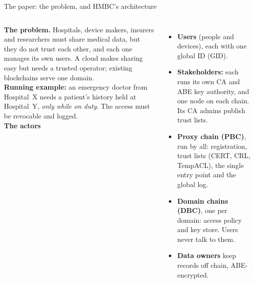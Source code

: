 \documentclass[aspectratio=169,10pt]{beamer}
\begin{document}
\begin{frame}{The paper: the problem, and HMBC's architecture}
\begin{columns}[T,onlytextwidth]
\scriptsize
\textbf{The problem.} Hospitals, device makers, insurers and researchers must share medical data, but \alert{they do not trust each other}, and each one manages its own users. A cloud makes sharing easy but needs a trusted operator; existing blockchains serve one domain.\\[0.3em]
\textbf{Running example:} an emergency doctor from Hospital~X needs a patient's history held at Hospital~Y, \emph{only while on duty}. The access must be revocable and logged.\\[0.3em]
\textbf{The actors}
\begin{itemize}\setlength{\itemsep}{1pt}
  \item \textbf{Users} (people and devices), each with one global ID (GID).
  \item \textbf{Stakeholders:} each runs its own CA and ABE key authority, and one node on each chain. Its CA admins publish trust lists.
  \item \textbf{\textcolor{pbc}{Proxy chain (PBC)}}, run by all: registration, trust lists (CERT, CRL, TempACL), the single entry point and the global log.
  \item \textbf{\textcolor{dbc}{Domain chains (DBC)}}, one per domain: access policy and key store. Users never talk to them.
  \item \textbf{Data owners} keep records off chain, ABE-encrypted.
\end{itemize}
\end{columns}
\end{frame}
\end{document}
